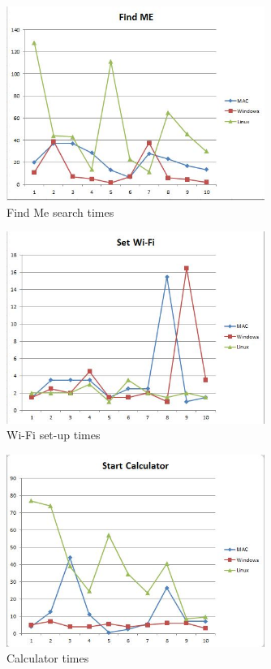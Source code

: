 \documentclass[11pt]{article}
\begin{document}
\begin{figure}[h!]
  \centering
    \includegraphics[width=0.75\textwidth]{./Images/Find_ME}
  \caption{Find Me search times}
 \label{Find}
\end{figure}

\begin{figure}[h!]
  \centering
    \includegraphics[width=0.75\textwidth]{./Images/Wi-Fi}
  \caption{Wi-Fi set-up times}
 \label{Wi-Fi}
\end{figure}

\begin{figure}[h!]
  \centering
    \includegraphics[width=0.75\textwidth]{./Images/Calculator}
  \caption{Calculator times}
 \label{Calc}
\end{figure}
\end{document}
